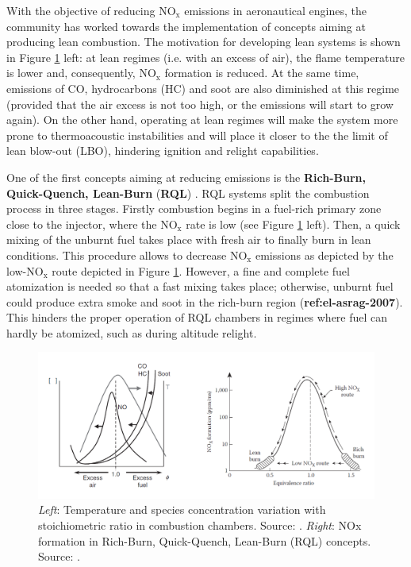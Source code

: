 
With the objective of reducing NO$_\mathrm{x}$ emissions in aeronautical engines, the community has worked towards the implementation of concepts aiming at producing lean combustion. The motivation for developing lean systems is shown in Figure \ref{fig:NOX_motivation_and_RQL} left: at lean regimes (i.e. with an excess of air), the flame temperature is lower and, consequently, NO$_\mathrm{x}$ formation is reduced. At the same time, emissions of CO, hydrocarbons (HC) and soot are also diminished at this regime (provided that the air excess is not too high, or the emissions will start to grow again). On the other hand, operating at lean regimes will make the system more prone to thermoacoustic instabilities and will place it closer to the the limit of lean blow-out (LBO), hindering ignition and relight capabilities. 

One of the first concepts aiming at reducing emissions is the \textbf{Rich-Burn, Quick-Quench, Lean-Burn} (\textbf{RQL})  . RQL systems split the combustion process in three stages. Firstly combustion begins in a fuel-rich primary zone close to the injector, where the NO$_\mathrm{x}$ rate is low (see Figure \ref{fig:NOX_motivation_and_RQL} left). Then, a quick mixing of the unburnt fuel takes place with fresh air to finally burn in lean conditions. This procedure allows to decrease NO$_\mathrm{x}$ emissions as depicted by the low-NO$_\mathrm{x}$ route depicted in Figure \ref{fig:NOX_motivation_and_RQL}. However, a fine and complete fuel atomization is needed so that a fast mixing takes place; otherwise, unburnt fuel could produce extra smoke and soot in the rich-burn region (\textbf{ref:el-asrag-2007}). This hinders the proper operation of RQL chambers in regimes where fuel can hardly be atomized, such as during altitude relight.

\begin{figure}[h!]
	\centering
	\includegraphics[scale=0.65]{./part0_intro/NOX_motivation_and_RQL}
	\caption{\textsl{Left}: Temperature and species concentration variation with stoichiometric ratio in combustion chambers. Source: . \textsl{Right}: NOx formation in Rich-Burn, Quick-Quench, Lean-Burn (RQL) concepts. Source: .}
	\label{fig:NOX_motivation_and_RQL}
\end{figure}

